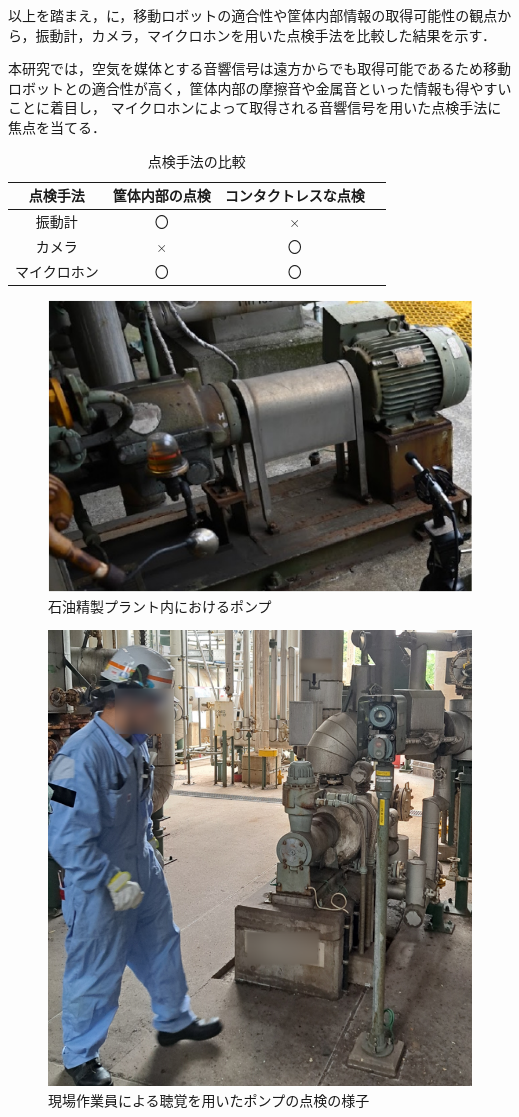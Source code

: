 \documentclass[../main]{subfiles}
\begin{document}
以上を踏まえ，に，移動ロボットの適合性や筐体内部情報の取得可能性の観点から，振動計，カメラ，マイクロホンを用いた点検手法を比較した結果を示す．

本研究では，空気を媒体とする音響信号は遠方からでも取得可能であるため移動ロボットとの適合性が高く，筐体内部の摩擦音や金属音といった情報も得やすいことに着目し，
マイクロホンによって取得される音響信号を用いた点検手法に焦点を当てる．



\begin{table}[htbp]
  \centering
  \caption{点検手法の比較}
  \label{tab:synthesis}
  \begin{tabular}{cccc}
  \toprule
  点検手法           & 筐体内部の点検& コンタクトレスな点検 \\ \hline
  振動計              & 〇                     & ×                   \\
  カメラ             & ×                     & 〇                   \\
  マイクロホン     & 〇                     & 〇                  \\ \bottomrule
  \end{tabular}
\end{table}

\begin{figure}[t]
  \centering
  \includegraphics[keepaspectratio, width=0.8\linewidth]{chap1/pump.pdf}
  \caption{石油精製プラント内におけるポンプ}
  \label{fig:pump}
\end{figure}

\begin{figure}[t]
  \centering
  \includegraphics[keepaspectratio, width=0.8\linewidth]{chap1/monitoring.png}
  \caption{現場作業員による聴覚を用いたポンプの点検の様子}
  \label{fig:monitoring}
\end{figure}
\end{document}
